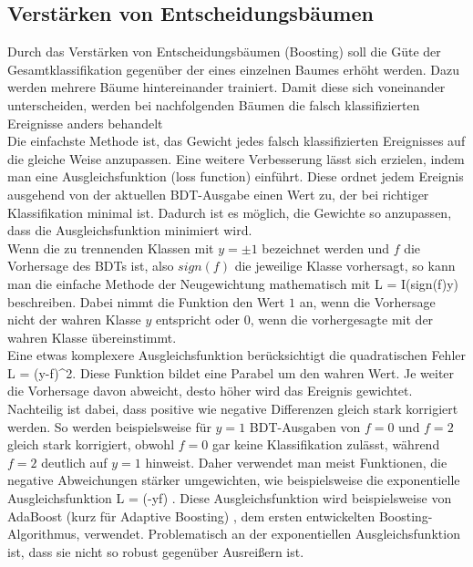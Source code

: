 \subsection{Verst\"arken von Entscheidungsb\"aumen}
\label{ch:Algorithmen:subsec:Boosting}

Durch das Verst\"arken von Entscheidungsb\"aumen (Boosting) soll die G\"ute der Gesamtklassifikation gegen\"uber der eines einzelnen Baumes erh\"oht werden. Dazu werden mehrere B\"aume hintereinander trainiert. Damit diese sich voneinander unterscheiden, werden bei nachfolgenden B\"aumen die falsch klassifizierten Ereignisse anders behandelt\\
Die einfachste Methode ist, das Gewicht jedes falsch klassifizierten Ereignisses auf die gleiche Weise anzupassen. Eine weitere Verbesserung l\"asst sich erzielen, indem man eine Ausgleichsfunktion (loss function) einf\"uhrt. Diese ordnet jedem Ereignis ausgehend von der aktuellen BDT-Ausgabe einen Wert zu, der bei richtiger Klassifikation minimal ist. Dadurch ist es m\"oglich, die Gewichte so anzupassen, dass die Ausgleichsfunktion minimiert wird.\\
Wenn die zu trennenden Klassen mit $y=\pm1$ bezeichnet werden und $f$ die Vorhersage des BDTs ist, also $sign(f)$ die jeweilige Klasse vorhersagt, so kann man die einfache Methode der Neugewichtung mathematisch mit
\beq
L = I(sign(f)\neq y)
\label{eq:missclass_loss}
\eeq
beschreiben. Dabei nimmt die Funktion den Wert $1$ an, wenn die Vorhersage nicht der wahren Klasse $y$ entspricht oder $0$, wenn die vorhergesagte mit der wahren Klasse \"ubereinstimmt.\\
Eine etwas komplexere Ausgleichsfunktion ber\"ucksichtigt die quadratischen Fehler
\beq
L = (y-f)^2.
\label{eq:squarederror_loss}
\eeq
Diese Funktion bildet eine Parabel um den wahren Wert. Je weiter die Vorhersage davon abweicht, desto h\"oher wird das Ereignis gewichtet. Nachteilig ist dabei, dass positive wie negative Differenzen gleich stark korrigiert werden. So werden beispielsweise f\"ur $y=1$ BDT-Ausgaben von $f=0$ und $f=2$ gleich stark korrigiert, obwohl $f=0$ gar keine Klassifikation zul\"asst, w\"ahrend $f=2$ deutlich auf $y=1$ hinweist. Daher verwendet man meist Funktionen, die negative Abweichungen st\"arker umgewichten, wie beispielsweise die exponentielle Ausgleichsfunktion
\beq
L = \exp(-y\cdot f)
\label{eq:exp_loss}.
\eeq
Diese Ausgleichsfunktion wird beispielsweise von AdaBoost (kurz f\"ur Adaptive Boosting) \cite{ADABoost}, dem ersten entwickelten Boosting-Algorithmus, verwendet. Problematisch an der exponentiellen Ausgleichsfunktion ist, dass sie nicht so robust gegen\"uber Ausrei\ss ern ist.\\
